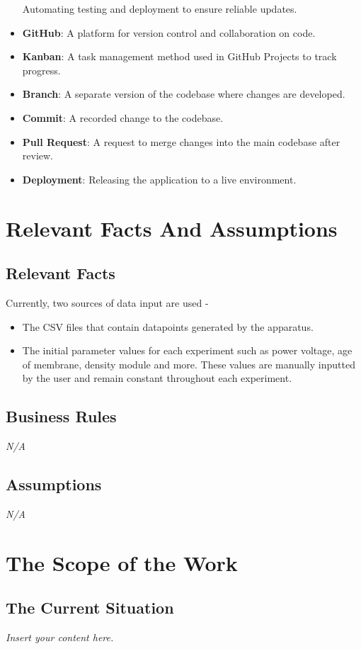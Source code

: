 \documentclass[12pt]{article}
\newcommand{\lips}{\textit{Insert your content here.}}
\begin{document}
\begin{itemize}
    Automating testing and deployment to ensure reliable updates.
    \item \textbf{GitHub}: A platform for version control and collaboration on
    code.
    \item \textbf{Kanban}: A task management method used in GitHub Projects to
    track progress.
    \item \textbf{Branch}: A separate version of the codebase where changes are
    developed.
    \item \textbf{Commit}: A recorded change to the codebase.
    \item \textbf{Pull Request}: A request to merge changes into the main
    codebase after review.
    \item \textbf{Deployment}: Releasing the application to a live environment.
\end{itemize}

\section{Relevant Facts And Assumptions}
\subsection{Relevant Facts}
Currently, two sources of data input are used -
\begin{itemize}
  \item The CSV files that contain datapoints generated by the apparatus.
  \item The initial parameter values for each experiment such as power voltage, age of membrane, density module and more. These values are manually inputted by the user 
  and remain constant throughout each experiment.
\end{itemize}

\subsection{Business Rules}
\emph{N/A}
\subsection{Assumptions}
\emph{N/A}

\section{The Scope of the Work}
\subsection{The Current Situation}
\lips
\end{document}
